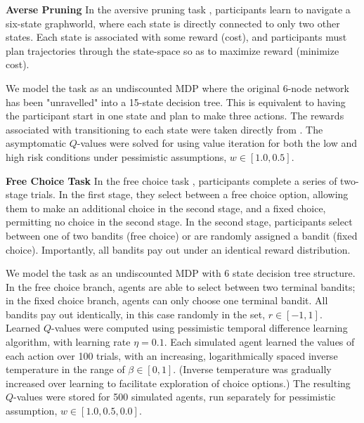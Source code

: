 \documentclass[11pt]{article} %
\begin{document}
\textbf{Averse Pruning} In the aversive pruning task \citep{Huys2012, Lally2017}, participants learn to navigate a six-state graphworld, where each state is directly connected to only two other states. Each state is associated with some reward (cost), and participants must plan trajectories through the state-space so as to maximize reward (minimize cost). 

We model the task as an undiscounted MDP where the original 6-node network has been "unravelled" into a 15-state decision tree. This is equivalent to having the participant start in one state and plan to make three actions. The rewards associated with transitioning to each state were taken directly from \citep{Huys2012, Lally2017}. The asymptomatic $Q$-values were solved for using value iteration for both the low and high risk conditions under pessimistic assumptions, $w \in [1.0, 0.5]$.

\textbf{Free Choice Task} In the free choice task \citep{Leotti2011}, participants complete a series of two-stage trials. In the first stage, they select between a free choice option, allowing them to make an additional choice in the second stage, and a fixed choice, permitting no choice in the second stage. In the second stage, participants select between one of two bandits (free choice) or are randomly assigned a bandit (fixed choice). Importantly, all bandits pay out under an identical reward distribution. 

We model the task as an undiscounted MDP with 6 state decision tree structure. In the free choice branch, agents are able to select between two terminal bandits; in the fixed choice branch, agents can only choose one terminal bandit. All bandits pay out identically, in this case randomly in the set, $r \in [-1, 1]$. Learned $Q$-values were computed using pessimistic temporal difference learning algorithm, with learning rate $\eta = 0.1$. Each simulated agent learned the values of each action over 100 trials, with an increasing, logarithmically spaced inverse temperature in the range of $\beta \in [0, 1]$. (Inverse temperature was gradually increased over learning to facilitate exploration of choice options.) The resulting $Q$-values were stored for 500 simulated agents, run separately for pessimistic assumption, $w \in [1.0, 0.5, 0.0]$. 


\small{}
\end{document}
